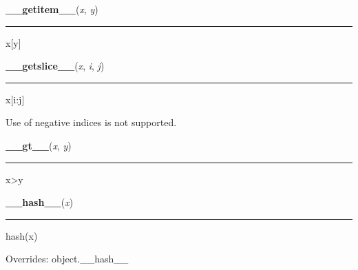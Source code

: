     \vspace{0.5ex}

    \begin{boxedminipage}{\textwidth}

    \raggedright \textbf{\_\_getitem\_\_}(\textit{x}, \textit{y})

    \vspace{-1.5ex}

    \rule{\textwidth}{0.5\fboxrule}

x{[}y{]}
    \vspace{1ex}

    \end{boxedminipage}

    \label{list:__getslice__}

    \vspace{0.5ex}

    \begin{boxedminipage}{\textwidth}

    \raggedright \textbf{\_\_getslice\_\_}(\textit{x}, \textit{i}, \textit{j})

    \vspace{-1.5ex}

    \rule{\textwidth}{0.5\fboxrule}

x{[}i:j{]}

Use of negative indices is not supported.
    \vspace{1ex}

    \end{boxedminipage}

    \label{list:__gt__}

    \vspace{0.5ex}

    \begin{boxedminipage}{\textwidth}

    \raggedright \textbf{\_\_gt\_\_}(\textit{x}, \textit{y})

    \vspace{-1.5ex}

    \rule{\textwidth}{0.5\fboxrule}

x{\textgreater}y
    \vspace{1ex}

    \end{boxedminipage}

    \vspace{0.5ex}

    \begin{boxedminipage}{\textwidth}

    \raggedright \textbf{\_\_hash\_\_}(\textit{x})

    \vspace{-1.5ex}

    \rule{\textwidth}{0.5\fboxrule}

hash(x)
    \vspace{1ex}

      Overrides: object.\_\_hash\_\_

    \end{boxedminipage}

